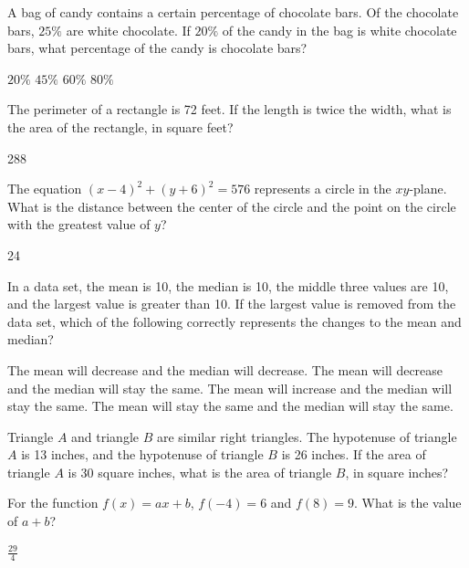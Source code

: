 \newpage




\question[1]
A bag of candy contains a certain percentage of chocolate bars. Of the chocolate bars, $25\%$ are white chocolate. If $20\%$ of the candy in the bag is white chocolate bars, what percentage of the candy is chocolate bars?
\begin{choices}
  \choice $20\%$
  \choice $45\%$
  \choice $60\%$
  \CorrectChoice $80\%$
\end{choices}

\question[1]
The perimeter of a rectangle is 72 feet. If the length is twice the width, what is the area of the rectangle, in square feet?
\begin{solution}
288
\end{solution}

\question[1]
The equation $(x-4)^2 + (y+6)^2 = 576$ represents a circle in the $xy$-plane. What is the distance between the center of the circle and the point on the circle with the greatest value of $y$?
\begin{solution}
24
\end{solution}



\newpage




\question[1]
In a data set, the mean is 10, the median is 10, the middle three values are 10, and the largest value is greater than 10. If the largest value is removed from the data set, which of the following correctly represents the changes to the mean and median?
\begin{choices}
  \choice The mean will decrease and the median will decrease.
  \CorrectChoice The mean will decrease and the median will stay the same.
  \choice The mean will increase and the median will stay the same.
  \choice The mean will stay the same and the median will stay the same.
\end{choices}

\question[1]
Triangle $A$ and triangle $B$ are similar right triangles. The hypotenuse of triangle $A$ is 13 inches, and the hypotenuse of triangle $B$ is 26 inches. If the area of triangle $A$ is 30 square inches, what is the area of triangle $B$, in square inches?
\begin{choices}
\end{choices}

\question[1]
For the function $f(x) = a x + b$, $f(-4) = 6$ and $f(8) = 9$. What is the value of $a + b$?
\begin{solution}
$\frac{29}{4}$
\end{solution}



